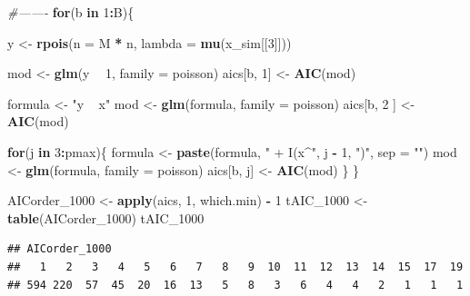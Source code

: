\documentclass[]{article}
\newenvironment{Shaded}{\begin{snugshade}}{\end{snugshade}}
\newcommand{\CommentTok}[1]{\textcolor[rgb]{0.56,0.35,0.01}{\textit{#1}}}
\newcommand{\ControlFlowTok}[1]{\textcolor[rgb]{0.13,0.29,0.53}{\textbf{#1}}}
\newcommand{\DataTypeTok}[1]{\textcolor[rgb]{0.13,0.29,0.53}{#1}}
\newcommand{\DecValTok}[1]{\textcolor[rgb]{0.00,0.00,0.81}{#1}}
\newcommand{\KeywordTok}[1]{\textcolor[rgb]{0.13,0.29,0.53}{\textbf{#1}}}
\newcommand{\NormalTok}[1]{#1}
\newcommand{\OperatorTok}[1]{\textcolor[rgb]{0.81,0.36,0.00}{\textbf{#1}}}
\newcommand{\StringTok}[1]{\textcolor[rgb]{0.31,0.60,0.02}{#1}}
\begin{document}
\begin{Shaded}
\begin{Highlighting}[]
\CommentTok{#-------}
\ControlFlowTok{for}\NormalTok{(b }\ControlFlowTok{in} \DecValTok{1}\OperatorTok{:}\NormalTok{B)\{}
  
\NormalTok{  y <-}\StringTok{ }\KeywordTok{rpois}\NormalTok{(}\DataTypeTok{n =}\NormalTok{ M }\OperatorTok{*}\StringTok{ }\NormalTok{n, }\DataTypeTok{lambda =} \KeywordTok{mu}\NormalTok{(x_sim[[}\DecValTok{3}\NormalTok{]]))}
  
\NormalTok{  mod <-}\StringTok{ }\KeywordTok{glm}\NormalTok{(y }\OperatorTok{~}\StringTok{ }\DecValTok{1}\NormalTok{, }\DataTypeTok{family =}\NormalTok{ poisson)}
\NormalTok{  aics[b, }\DecValTok{1}\NormalTok{] <-}\StringTok{ }\KeywordTok{AIC}\NormalTok{(mod)}
  
\NormalTok{  formula <-}\StringTok{ "y ~ x"}
\NormalTok{  mod <-}\StringTok{ }\KeywordTok{glm}\NormalTok{(formula, }\DataTypeTok{family =}\NormalTok{ poisson)}
\NormalTok{  aics[b, }\DecValTok{2}\NormalTok{ ] <-}\StringTok{ }\KeywordTok{AIC}\NormalTok{(mod)}
  
  \ControlFlowTok{for}\NormalTok{(j }\ControlFlowTok{in} \DecValTok{3}\OperatorTok{:}\NormalTok{pmax)\{}
\NormalTok{    formula <-}\StringTok{ }\KeywordTok{paste}\NormalTok{(formula, }\StringTok{" + I(x^"}\NormalTok{, j }\OperatorTok{-}\StringTok{ }\DecValTok{1}\NormalTok{, }\StringTok{")"}\NormalTok{, }\DataTypeTok{sep =} \StringTok{""}\NormalTok{)}
\NormalTok{    mod <-}\StringTok{ }\KeywordTok{glm}\NormalTok{(formula, }\DataTypeTok{family =}\NormalTok{ poisson)}
\NormalTok{    aics[b, j] <-}\StringTok{ }\KeywordTok{AIC}\NormalTok{(mod)}
\NormalTok{  \}}
\NormalTok{\}}

\NormalTok{AICorder_}\DecValTok{1000}\NormalTok{ <-}\StringTok{ }\KeywordTok{apply}\NormalTok{(aics, }\DecValTok{1}\NormalTok{, which.min) }\OperatorTok{-}\StringTok{ }\DecValTok{1}
\NormalTok{tAIC_}\DecValTok{1000}\NormalTok{ <-}\StringTok{ }\KeywordTok{table}\NormalTok{(AICorder_}\DecValTok{1000}\NormalTok{)}
\NormalTok{tAIC_}\DecValTok{1000}
\end{Highlighting}
\end{Shaded}

\begin{verbatim}
## AICorder_1000
##   1   2   3   4   5   6   7   8   9  10  11  12  13  14  15  17  19 
## 594 220  57  45  20  16  13   5   8   3   6   4   4   2   1   1   1
\end{verbatim}
\end{document}
